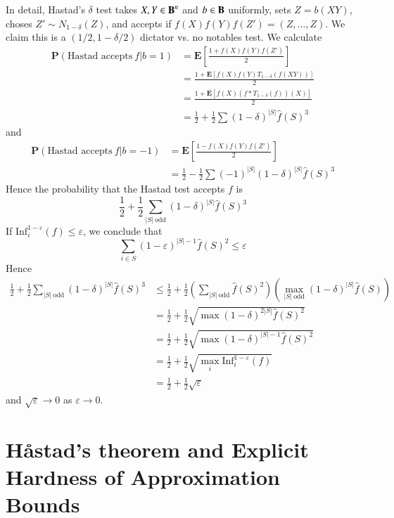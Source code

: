 In detail, Hastad's $\delta$ test takes $X,Y \in \operatorname{\mathbf{B}}^n$ and $b \in \operatorname{\mathbf{B}}$ uniformly, sets $Z = b(XY)$, choses $Z' \sim N_{1 - \delta}(Z)$, and accepts if $f(X)f(Y)f(Z') = (Z,\dots,Z)$. We claim this is a $(1/2, 1 - \delta/2)$ dictator vs. no notables test. We calculate
%
\begin{align*}
    \mathbf{P}(\text{Hastad accepts}\ f | b = 1) &= \mathbf{E} \left[ \frac{1 + f(X)f(Y)f(Z')}{2} \right]\\
    &= \frac{1 + \mathbf{E}[f(X)f(Y) T_{1-\delta}(f(XY))]}{2}\\
    &= \frac{1 + \mathbf{E}[f(X) (f * T_{1 - \delta}(f))(X)]}{2}\\
    &= \frac{1}{2} + \frac{1}{2} \sum (1 - \delta)^{|S|} \widehat{f}(S)^3
\end{align*}
%
and
%
\begin{align*}
    \mathbf{P}(\text{Hastad accepts}\ f | b = -1) &= \mathbf{E} \left[ \frac{1 - f(X)f(Y)f(Z')}{2} \right]\\
    &= \frac{1}{2} - \frac{1}{2} \sum (-1)^{|S|} (1 - \delta)^{|S|} \widehat{f}(S)^3
\end{align*}
%
Hence the probability that the Hastad test accepts $f$ is
%
\[ \frac{1}{2} + \frac{1}{2} \sum_{|S|\ \text{odd}} (1 - \delta)^{|S|} \widehat{f}(S)^3 \]
%
If $\text{Inf}^{1-\varepsilon}_i(f) \leq \varepsilon$, we conclude that
%
\[ \sum_{i \in S} (1 - \varepsilon)^{|S|-1} \widehat{f}(S)^2 \leq \varepsilon \]
%
Hence
%
\begin{align*}
    \frac{1}{2} + \frac{1}{2} \sum_{|S|\ \text{odd}} (1 - \delta)^{|S|} \widehat{f}(S)^3 &\leq \frac{1}{2} + \frac{1}{2} \left( \sum_{|S|\ \text{odd}} \widehat{f}(S)^2 \right) \left( \max_{|S|\ \text{odd}} (1 - \delta)^{|S|} \widehat{f}(S) \right)\\
    &= \frac{1}{2} + \frac{1}{2} \sqrt{ \max (1 - \delta)^{2|S|} \widehat{f}(S)^2 }\\
    &= \frac{1}{2} + \frac{1}{2} \sqrt{ \max (1 - \delta)^{|S| - 1} \widehat{f}(S)^2 }\\
    &= \frac{1}{2} + \frac{1}{2} \sqrt{ \max_i \text{Inf}_i^{1 - \varepsilon}(f) }\\
    &= \frac{1}{2} + \frac{1}{2} \sqrt{\varepsilon}
\end{align*}
%
and $\sqrt{\varepsilon} \to 0$ as $\varepsilon \to 0$.

\section{Håstad's theorem and Explicit Hardness of Approximation Bounds}

